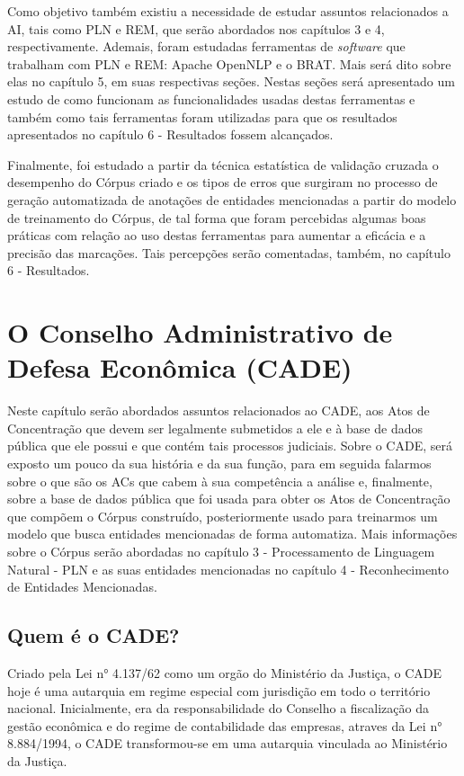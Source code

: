 \documentclass[11pt]{report}
\begin{document}
Como objetivo também existiu a necessidade de estudar assuntos relacionados a AI, tais como PLN e REM, que serão abordados nos capítulos 3 e 4, respectivamente.
Ademais, foram estudadas ferramentas de \textit{software} que trabalham com PLN e REM: Apache OpenNLP e o BRAT. Mais será dito sobre elas no capítulo 5, em suas
respectivas seções. Nestas seções será apresentado um estudo de como funcionam as funcionalidades usadas destas ferramentas e também como tais ferramentas foram
utilizadas para que os resultados apresentados no capítulo 6 - Resultados fossem alcançados.

Finalmente, foi estudado a partir da técnica estatística de validação cruzada o desempenho do Córpus criado e os tipos de erros que surgiram no processo de geração automatizada
de anotações de entidades mencionadas a partir do modelo de treinamento do Córpus, de tal forma que foram percebidas algumas boas práticas com relação ao uso destas ferramentas
para aumentar a eficácia e a precisão das marcações. Tais percepções serão comentadas, também, no capítulo 6 - Resultados.

\pagebreak
\chapter{O Conselho Administrativo de Defesa Econômica (CADE)}

\indent\indent Neste capítulo serão abordados assuntos relacionados ao CADE, aos Atos de Concentração que devem ser legalmente submetidos a ele e à base de dados pública que ele possui e
que contém tais processos judiciais. Sobre o CADE, será exposto um pouco da sua história e da sua função, para em seguida falarmos sobre o que são os ACs que cabem à sua competência
a análise e, finalmente, sobre a base de dados pública que foi usada para obter os Atos de Concentração que compõem o Córpus construído, posteriormente usado para treinarmos um modelo
que busca entidades mencionadas de forma automatiza. Mais informações sobre o Córpus serão abordadas no capítulo 3 - Processamento de Linguagem Natural - PLN e as suas entidades mencionadas no capítulo 4 - Reconhecimento de Entidades Mencionadas.

\section{Quem é o CADE?}

\indent\indent Criado pela Lei n° 4.137/62 como um orgão do Ministério da Justiça, o CADE hoje é uma autarquia em regime especial com jurisdição em todo o território nacional. Inicialmente,
era da responsabilidade do Conselho a fiscalização da gestão econômica e do regime de contabilidade das empresas, atraves da Lei n° 8.884/1994, o CADE transformou-se em uma
autarquia vinculada ao Ministério da Justiça.
\end{document}
